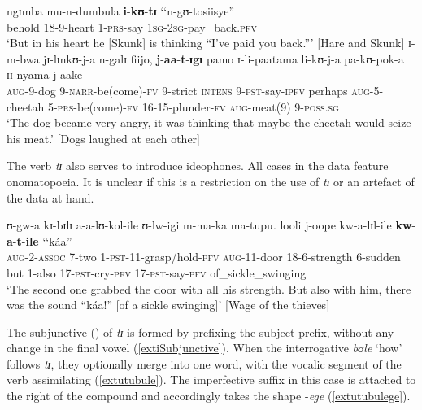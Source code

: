 \begin{exe}
\ex \gll ngɪmba mu-n-dumbula \textbf{i}-\textbf{kʊ}-\textbf{tɪ} \textup{\lq\lq}n-gʊ-tosiisye\textup{''}\\
behold 18-9-heart 1-\textsc{prs}-say \phantom{\lq\lq}\textsc{1sg}-\textsc{2sg}-pay\_back.\textsc{pfv}\\
\glt `But in his heart he [Skunk] is thinking ``I've paid you back.''{}' [Hare and Skunk]
\ex \gll ɪ-m-bwa jɪ-lɪnkʊ-j-a n-galɪ fiijo, \textbf{j}-\textbf{aa}-\textbf{t}-\textbf{ɪgɪ} pamo ɪ-li-paatama li-kʊ-j-a pa-kʊ-pok-a ɪɪ-nyama j-aake\\
\textsc{aug}-9-dog 9-\textsc{narr}-be(come)-\textsc{fv} 9-strict \textsc{intens} 9-\textsc{pst}-say-\textsc{ipfv} perhaps \textsc{aug}-5-cheetah 5-\textsc{prs}-be(come)-\textsc{fv} 16-15-plunder-\textsc{fv} \textsc{aug}-meat(9) 9-\textsc{poss.sg}\\
\glt `The dog became very angry, it was thinking that maybe the cheetah would seize his meat.' [Dogs laughed at each other]
\end{exe}

The verb \textit{tɪ} also serves to introduce ideophones. All cases in the data feature onomatopoeia. It is unclear if this is a restriction on the use of \textit{tɪ} or an artefact of the data at hand.

\begin{exe}
\ex\label{extiPFVPFVideoph1}
\gll ʊ-gw-a kɪ-bɪlɪ a-a-lʊ-kol-ile ʊ-lw-igi m-ma-ka ma-tupu. looli j-oope kw-a-lɪl-ile \textbf{kw}-\textbf{a}-\textbf{t}-\textbf{ile} \textup{\lq\lq}káa\textup{''}\\
\textsc{aug}-2-\textsc{assoc} 7-two 1-\textsc{pst}-11-grasp/hold-\textsc{pfv} \textsc{aug}-11-door 18-6-strength 6-sudden but 1-also 17-\textsc{pst}-cry-\textsc{pfv} 17-\textsc{pst}-say-\textsc{pfv} \phantom{\lq\lq}of\_sickle\_swinging\\
\glt `The second one grabbed the door with all his strength. But also with him, there was the sound ``káa!'' [of a sickle swinging]' [Wage of the thieves]
\end{exe}

\label{SubjunctiveTiBule}The subjunctive () of \textit{tɪ} is formed by prefixing the subject prefix, without any change in the final vowel (\ref{extiSubjunctive}). When the interrogative \textit{bʊle} `how' follows \textit{tɪ}, they optionally merge into one word, with the vocalic segment of the verb assimilating (\ref{extutubule}). The imperfective suffix in this case is attached to the right of the compound  and accordingly takes the shape -\textit{ege} (\ref{extutubulege}).

